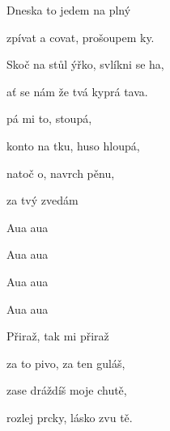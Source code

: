 

\zr
Dneska to jedem na plný 

zpívat a covat, prošoupem ky.

Skoč na stůl ýřko, svlíkni se ha,

ať se nám že tvá kyprá tava.
\kr


\zs
{}pá mi to, stoupá,

konto na tku, huso hloupá,

natoč o, navrch pěnu,

za tvý  zvedám 
\ks

\zr \kr

\zr
Aua aua

Aua aua



Aua aua

Aua aua
\kr


\zs
Přiraž, tak mi přiraž

za to pivo, za ten guláš,

zase dráždíš moje chutě,

rozlej prcky, lásko zvu tě.
\ks


\zr \kr
\zr \kr

\kp


















